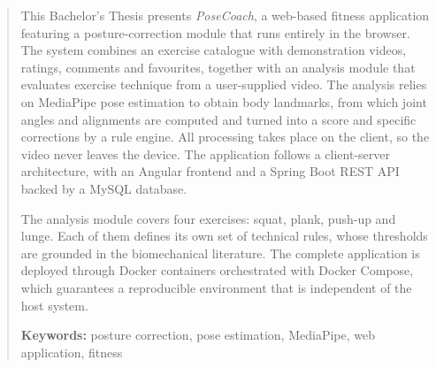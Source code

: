 \documentclass[12pt,a4paper,twoside,openright]{book}
\begin{document}
    \renewcommand{\abstractname}{Abstract}
    \begin{abstract}
        This Bachelor's Thesis presents \emph{PoseCoach}, a web-based fitness
        application featuring a posture-correction module that runs entirely in
        the browser. The system combines an exercise catalogue with
        demonstration videos, ratings, comments and favourites, together with an
        analysis module that evaluates exercise technique from a user-supplied
        video. The analysis relies on MediaPipe pose estimation to obtain body
        landmarks, from which joint angles and alignments are computed and turned
        into a score and specific corrections by a rule engine. All processing
        takes place on the client, so the video never leaves the device. The
        application follows a client-server architecture, with an Angular
        frontend and a Spring Boot REST API backed by a MySQL database.
        
        The analysis module covers four exercises: squat, plank, push-up and
        lunge. Each of them defines its own set of technical rules, whose
        thresholds are grounded in the biomechanical literature. The complete
        application is deployed through Docker containers orchestrated with
        Docker Compose, which guarantees a reproducible environment that is
        independent of the host system.
        \medskip

        \noindent\textbf{Keywords:} posture correction, pose estimation,
        MediaPipe, web application, fitness
    \end{abstract}


    \clearpage
    \tableofcontents
    \clearpage
    \listoffigures
    \clearpage
    \listoftables
    \clearpage
\end{document}
